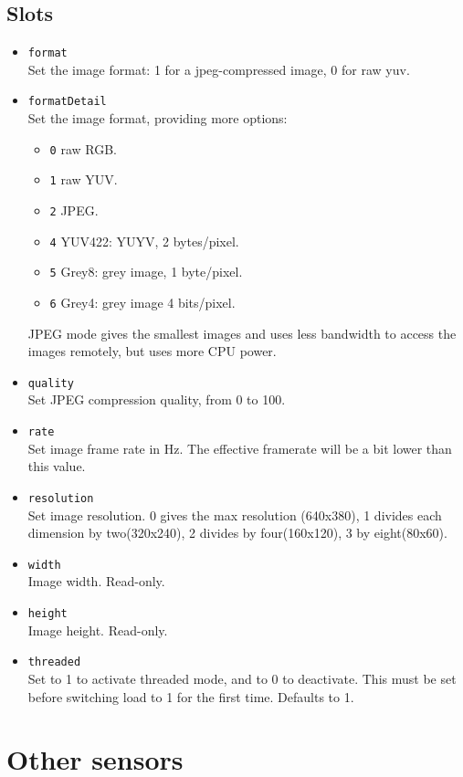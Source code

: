 \subsection{Slots}
\begin{itemize}
\item \lstinline|format| \\
  Set the image format: 1 for a jpeg-compressed image, 0 for raw yuv.
\item \lstinline|formatDetail| \\
  Set the image format, providing more options:
  \begin{itemize}
  \item \lstinline|0| raw RGB.
  \item \lstinline|1| raw YUV.
  \item \lstinline|2| JPEG.
  \item \lstinline|4| YUV422:  YUYV, 2 bytes/pixel.
  \item \lstinline|5| Grey8: grey image, 1 byte/pixel.
  \item \lstinline|6| Grey4: grey image 4 bits/pixel.
  \end{itemize}
  JPEG mode gives the smallest images and uses less bandwidth to access the
  images remotely, but uses more CPU power.
\item \lstinline|quality| \\
  Set JPEG compression quality, from 0 to 100.
\item \lstinline|rate| \\
  Set image frame rate in Hz. The effective framerate will be a bit lower than
  this value.
\item \lstinline|resolution| \\
  Set image resolution.  0 gives the max resolution (640x380), 1 divides each
  dimension by two(320x240), 2 divides by four(160x120), 3 by eight(80x60).
\item \lstinline|width| \\
  Image width. Read-only.
\item \lstinline|height| \\
  Image height. Read-only.
\item \lstinline|threaded| \\
  Set to 1 to activate threaded mode, and to 0 to deactivate. This must be set
  before switching load to 1 for the first time. Defaults to 1.
\end{itemize}




\section{Other sensors}

